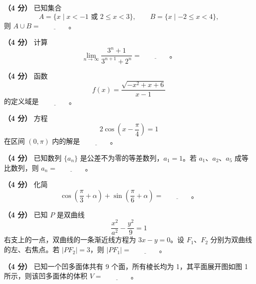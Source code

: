 \begin{question}
\textbf{（4 分）} 已知集合
\nopagebreak[4]
\[
A=\{x\mid x<-1\text{ 或 }2\le x<3\},\qquad B=\{x\mid -2\le x<4\},
\]
则 \(A\cup B=\underline{\qquad\qquad}\)。

\end{question}
\begin{question}
\textbf{（4 分）} 计算
\nopagebreak[4]
\[
\lim_{n\to\infty}\frac{3^n+1}{3^{n+1}+2^n}=\underline{\qquad\qquad}\text{。}
\]

\end{question}
\begin{question}
\textbf{（4 分）} 函数
\nopagebreak[4]
\[
f(x)=\frac{\sqrt{-x^2+x+6}}{x-1}
\]
的定义域是 \(\underline{\qquad\qquad}\)。

\end{question}
\begin{question}
\textbf{（4 分）} 方程
\nopagebreak[4]
\[
2\cos\left(x-\frac\pi4\right)=1
\]
在区间 \((0,\pi)\) 内的解是 \(\underline{\qquad\qquad}\)。

\end{question}
\begin{question}
\textbf{（4 分）} 已知数列 \(\{a_n\}\) 是公差不为零的等差数列，\(a_1=1\)。若 \(a_1\text{、}a_2\text{、}a_5\) 成等比数列，则 \(a_n=\underline{\qquad\qquad}\)。

\end{question}
\begin{question}
\textbf{（4 分）} 化简
\nopagebreak[4]
\[
\cos\left(\frac\pi3+\alpha\right)+\sin\left(\frac\pi6+\alpha\right)=\underline{\qquad\qquad}\text{。}
\]

\end{question}
\begin{question}
\textbf{（4 分）} 已知 \(P\) 是双曲线
\nopagebreak[4]
\[
\frac{x^2}{a^2}-\frac{y^2}{9}=1
\]
右支上的一点，双曲线的一条渐近线方程为 \(3x-y=0\)。设 \(F_1\text{、}F_2\) 分别为双曲线的左、右焦点。若 \(|PF_2|=3\)，则 \(|PF_1|=\underline{\qquad\qquad}\)。

\Needspace{0.4\textheight}
\end{question}
\begin{question}
\textbf{（4 分）} 已知一个凹多面体共有 9 个面，所有棱长均为 1，其平面展开图如图 1 所示，则该凹多面体的体积 \(V=\underline{\qquad\qquad}\)。
\nopagebreak[4]
\begin{center}\end{center}
\nopagebreak[4]
\end{question}
